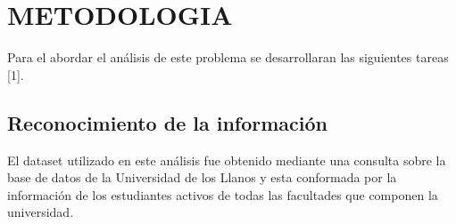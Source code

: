 \section{METODOLOGIA}

 Para el abordar el análisis de este problema se desarrollaran las siguientes tareas [1].
 
  \subsection{Reconocimiento de la información}
 
 El dataset utilizado en este análisis fue obtenido mediante una consulta sobre la base de datos de la Universidad de los Llanos y esta conformada por la información de los estudiantes activos de todas las facultades que componen la universidad.
 
